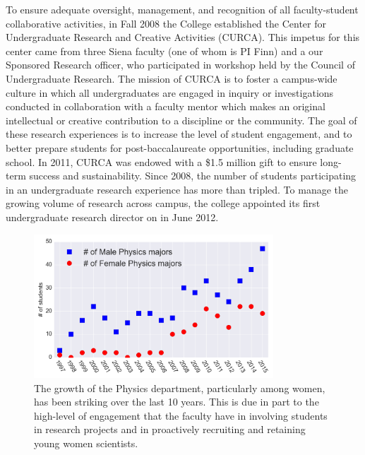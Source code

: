 \documentclass[11pt, preprint]{aastex}
\begin{document}

				

To ensure adequate oversight, management, and recognition of all faculty-student
collaborative activities, in Fall 2008 the College established the Center for
Undergraduate Research and Creative Activities (CURCA).  This impetus
for this center came from three Siena faculty (one of whom is PI Finn)
and a our Sponsored Research officer, who participated in workshop held by the Council of
Undergraduate Research.  The mission of CURCA is
to foster a campus-wide culture in which all undergraduates are engaged in
inquiry or investigations conducted in collaboration with a faculty mentor which
makes an original intellectual or creative contribution to a discipline or the
community.  The goal of these research experiences is to increase the level of
student engagement, and to better prepare students for post-baccalaureate
opportunities, including graduate school. In 2011, CURCA was endowed with a
\$1.5 million gift to ensure long-term success and sustainability. Since 2008,
the number of students participating in an undergraduate research experience has
more than tripled. To manage the growing volume of research across
campus, the college appointed its first undergraduate research director
on in June 2012.



\begin{figure}[h]
\centering
\includegraphics[width=0.8\textwidth]{dept_plot.png}
\caption{The growth of the Physics department, particularly among women, has
  been striking over the last 10 years.  This is due in part to the high-level
  of engagement that the faculty have in involving students in research projects
  and in proactively recruiting and retaining young women scientists.
\label{fig:dept}}
\end{figure}
\end{document}
